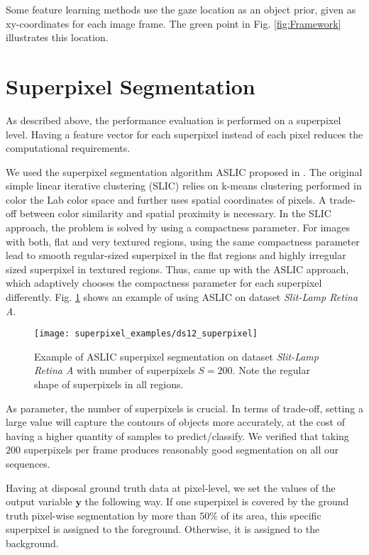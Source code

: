 Some feature learning methods use the gaze location as an object prior, given as xy-coordinates for each image frame. The green point in Fig. \ref{fig:Framework} illustrates this location.

\section{Superpixel Segmentation} \label{superpixel_segm}
As described above, the performance evaluation is performed on a superpixel level. Having a feature vector for each superpixel instead of each pixel reduces the computational requirements. 

We used the superpixel segmentation algorithm ASLIC proposed in \cite{achanta12}.
The original simple linear iterative clustering (SLIC) relies on k-means clustering performed in color the Lab color space and further uses spatial coordinates of pixels.
A trade-off between color similarity and spatial proximity is necessary.
In the SLIC approach, the problem is solved by using a compactness parameter.
For images with both, flat and very textured regions, using the same compactness parameter lead to smooth regular-sized superpixel in the flat regions and highly irregular sized superpixel in textured regions.
Thus, \cite{a} came up with the ASLIC approach, which adaptively chooses the compactness parameter for each superpixel differently.
Fig. \ref{fig:ExSuperpixel} shows an example of using ASLIC on dataset \textit{Slit-Lamp Retina A}.

\begin{figure}[!htbp]
  \centering
  \label{fig:subfig:example_superpixel}
  \texttt{[image: superpixel\_examples/ds12\_superpixel]}
  \caption[Example of superpixel segmentation]{Example of ASLIC superpixel segmentation on dataset \textit{Slit-Lamp Retina A} with number of superpixels $S=200$. Note the regular shape of superpixels in all regions.}
  \label{fig:ExSuperpixel}
\end{figure}

As parameter, the number of superpixels is crucial. In terms of trade-off, setting a large value will capture the contours of objects more accurately, at the cost of having a higher quantity of samples to predict/classify. We verified that taking $200$ superpixels per frame produces reasonably good segmentation on all our sequences.

Having at disposal ground truth data at pixel-level, we set the values of the output variable $\boldsymbol{y}$ the following way.
If one superpixel is covered by the ground truth pixel-wise segmentation by more than $50\%$ of its area, this specific superpixel is assigned to the foreground. Otherwise, it is assigned to the background.

